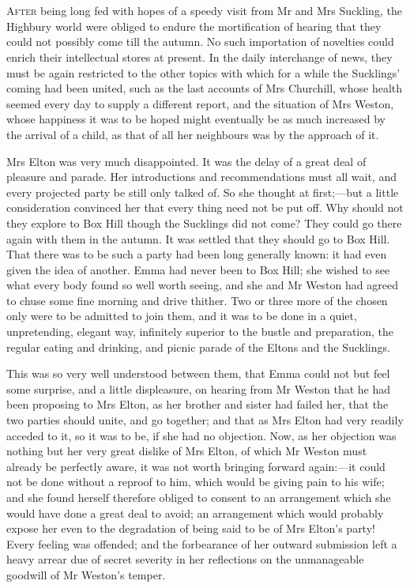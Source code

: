 \chapter[Chapter \thechapter]{}
\lettrine[lraise=0.3]{A}{fter} being long fed with hopes of a speedy visit from Mr and Mrs Suckling, the Highbury world were obliged to endure the mortification of hearing that they could not possibly come till the autumn. No such importation of novelties could enrich their intellectual stores at present. In the daily interchange of news, they must be again restricted to the other topics with which for a while the Sucklings' coming had been united, such as the last accounts of Mrs Churchill, whose health seemed every day to supply a different report, and the situation of Mrs Weston, whose happiness it was to be hoped might eventually be as much increased by the arrival of a child, as that of all her neighbours was by the approach of it.

Mrs Elton was very much disappointed. It was the delay of a great deal of pleasure and parade. Her introductions and recommendations must all wait, and every projected party be still only talked of. So she thought at first;—but a little consideration convinced her that every thing need not be put off. Why should not they explore to Box Hill though the Sucklings did not come? They could go there again with them in the autumn. It was settled that they should go to Box Hill. That there was to be such a party had been long generally known: it had even given the idea of another. Emma had never been to Box Hill; she wished to see what every body found so well worth seeing, and she and Mr Weston had agreed to chuse some fine morning and drive thither. Two or three more of the chosen only were to be admitted to join them, and it was to be done in a quiet, unpretending, elegant way, infinitely superior to the bustle and preparation, the regular eating and drinking, and picnic parade of the Eltons and the Sucklings.

This was so very well understood between them, that Emma could not but feel some surprise, and a little displeasure, on hearing from Mr Weston that he had been proposing to Mrs Elton, as her brother and sister had failed her, that the two parties should unite, and go together; and that as Mrs Elton had very readily acceded to it, so it was to be, if she had no objection. Now, as her objection was nothing but her very great dislike of Mrs Elton, of which Mr Weston must already be perfectly aware, it was not worth bringing forward again:—it could not be done without a reproof to him, which would be giving pain to his wife; and she found herself therefore obliged to consent to an arrangement which she would have done a great deal to avoid; an arrangement which would probably expose her even to the degradation of being said to be of Mrs Elton's party! Every feeling was offended; and the forbearance of her outward submission left a heavy arrear due of secret severity in her reflections on the unmanageable goodwill of Mr Weston's temper.

